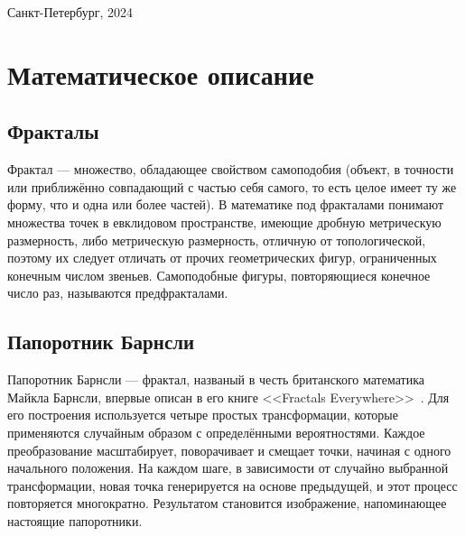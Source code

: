 \documentclass[a4paper, final]{article}
\begin{document}
	\hfill \break
	\begin{center} \small{Санкт-Петербург, 2024} \end{center}
	\thispagestyle{empty} %
	
	\newpage
	
	\tableofcontents
	
	
	
	
	
	
	\newpage
	\section {Математическое описание}
	\subsection{Фракталы}
	Фрактал — множество, обладающее свойством самоподобия (объект, в точности или приближённо совпадающий с частью себя самого, то есть целое имеет ту же форму, что и одна или более частей). В математике под фракталами понимают множества точек в евклидовом пространстве, имеющие дробную метрическую размерность, либо метрическую размерность, отличную от топологической, поэтому их следует отличать от прочих геометрических фигур, ограниченных конечным числом звеньев. Самоподобные фигуры, повторяющиеся конечное число раз, называются предфракталами.
	
	
	\subsection{Папоротник Барнсли}
	Папоротник Барнсли — фрактал, названый в честь британского математика Майкла Барнсли, впервые описан в его книге <<Fractals Everywhere>>~\cite{barnsley}. Для его построения используется четыре простых трансформации, которые применяются случайным образом с определёнными вероятностями. Каждое преобразование масштабирует, поворачивает и смещает точки, начиная с одного начального положения. На каждом шаге, в зависимости от случайно выбранной трансформации, новая точка генерируется на основе предыдущей, и этот процесс повторяется многократно. Результатом становится изображение, напоминающее настоящие папоротники.
	
\end{document}
